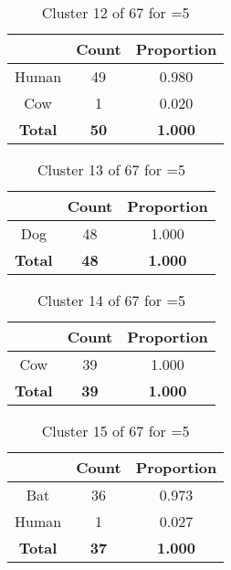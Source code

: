 \begin{table}[ht!]
\centering
\begin{tabular}{|c|c|c|}
\hline
\bf \Spec{} &\bf Count &\bf Proportion\\ \hline \hline
Human & 49 & 0.980\\ \hline
Cow & 1 & 0.020\\ \hline
\hline
\bf Total & \bf 50 & \bf 1.000\\ \hline
\end{tabular}
\label{tab:cluster:12:5}
\caption{Cluster 12 of 67 for \minneigh{}=5}
\end{table}

\begin{table}[ht!]
\centering
\begin{tabular}{|c|c|c|}
\hline
\bf \Spec{} &\bf Count &\bf Proportion\\ \hline \hline
Dog & 48 & 1.000\\ \hline
\hline
\bf Total & \bf 48 & \bf 1.000\\ \hline
\end{tabular}
\label{tab:cluster:13:5}
\caption{Cluster 13 of 67 for \minneigh{}=5}
\end{table}

\begin{table}[ht!]
\centering
\begin{tabular}{|c|c|c|}
\hline
\bf \Spec{} &\bf Count &\bf Proportion\\ \hline \hline
Cow & 39 & 1.000\\ \hline
\hline
\bf Total & \bf 39 & \bf 1.000\\ \hline
\end{tabular}
\label{tab:cluster:14:5}
\caption{Cluster 14 of 67 for \minneigh{}=5}
\end{table}

\begin{table}[ht!]
\centering
\begin{tabular}{|c|c|c|}
\hline
\bf \Spec{} &\bf Count &\bf Proportion\\ \hline \hline
Bat & 36 & 0.973\\ \hline
Human & 1 & 0.027\\ \hline
\hline
\bf Total & \bf 37 & \bf 1.000\\ \hline
\end{tabular}
\label{tab:cluster:15:5}
\caption{Cluster 15 of 67 for \minneigh{}=5}
\end{table}

